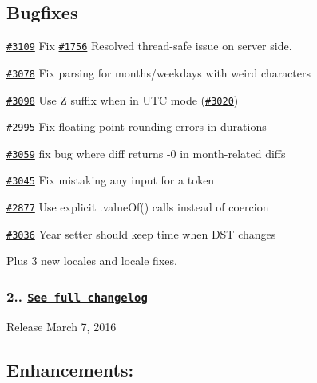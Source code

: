 \subsection*{Bugfixes}


\begin{DoxyItemize}
\item \href{https://github.com/moment/moment/pull/3109}{\tt \#3109} Fix \href{https://github.com/moment/moment/issues/1756}{\tt \#1756} Resolved thread-\/safe issue on server side.
\item \href{https://github.com/moment/moment/pull/3078}{\tt \#3078} Fix parsing for months/weekdays with weird characters
\item \href{https://github.com/moment/moment/pull/3098}{\tt \#3098} Use Z suffix when in U\+TC mode (\href{https://github.com/moment/moment/issues/3020}{\tt \#3020})
\item \href{https://github.com/moment/moment/pull/2995}{\tt \#2995} Fix floating point rounding errors in durations
\item \href{https://github.com/moment/moment/pull/3059}{\tt \#3059} fix bug where diff returns -\/0 in month-\/related diffs
\item \href{https://github.com/moment/moment/pull/3045}{\tt \#3045} Fix mistaking any input for \textquotesingle{}a\textquotesingle{} token
\item \href{https://github.com/moment/moment/pull/2877}{\tt \#2877} Use explicit .value\+Of() calls instead of coercion
\item \href{https://github.com/moment/moment/pull/3036}{\tt \#3036} Year setter should keep time when D\+ST changes
\end{DoxyItemize}

Plus 3 new locales and locale fixes.

\subsubsection*{2.. \href{https://gist.github.com/ichernev/6e5bfdf8d6522fc4ac73}{\tt See full changelog}}


\begin{DoxyItemize}
\item Release March 7, 2016
\end{DoxyItemize}

\subsection*{Enhancements\+:}


